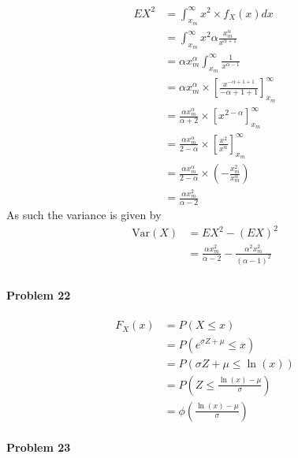 \begin{align*}
    EX^{2}&=\int_{x_{m}}^{\infty}x^{2}\times f_{X}(x)dx \\
       &=\int_{x_{m}}^{\infty}x^{2}\alpha\frac{x_{m}^{\alpha}}{x^{\alpha+1}} \\
       &=\alpha x_{m}^{\alpha}\int_{x_{m}}^{\infty}\frac{1}{x^{\alpha-1}} \\
       &=\alpha x_{m}^{\alpha}\times\left[\frac{x^{-\alpha+1+1}}{-\alpha+1+1}\right]_{x_{m}}^{\infty} \\
       &=\frac{\alpha x_{m}^{\alpha}}{\alpha+2}\times\left[x^{2-\alpha}\right]_{x_{m}}^{\infty} \\
       &=\frac{\alpha x_{m}^{\alpha}}{2-\alpha}\times\left[\frac{x^{2}}{x^{\alpha}}\right]_{x_{m}}^{\infty} \\
       &=\frac{\alpha x_{m}^{\alpha}}{2-\alpha}\times\left(-\frac{x_{m}^{2}}{x_{m}^{\alpha}}\right) \\
       &=\frac{\alpha x_{m}^{2}}{\alpha-2}
\end{align*}
As such the variance is given by
\begin{align*}
    \text{Var}(X)&=EX^{2}-(EX)^{2} \\
             &=\frac{\alpha x_{m}^{2}}{\alpha-2}-\frac{\alpha^{2}x_{m}^{2}}{(\alpha-1)^{2}} \\
\end{align*}
\paragraph{Problem 22}
\begin{align*}
    F_{X}(x)&=P(X\leq x) \\
            &=P(e^{\sigma Z+\mu}\leq x) \\
            &=P(\sigma Z+\mu\leq\ln(x)) \\
            &=P\left(Z\leq\frac{\ln(x)-\mu}{\sigma}\right) \\
            &=\phi\left(\frac{\ln(x)-\mu}{\sigma}\right)
\end{align*}
\paragraph{Problem 23}
